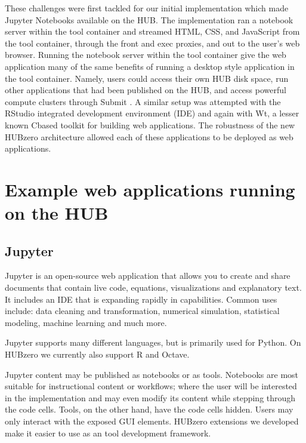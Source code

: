 \documentclass[conference]{../sty/IEEEtran}
\newcommand\CC{C\nolinebreak[4]\hspace{-.05em}\raisebox{.4ex}{\relsize{-3}{\textbf{++}}}\hspace{.25em}}
\begin{document}
These challenges were first tackled for our initial implementation which made
Jupyter Notebooks available on the HUB. The implementation ran a notebook
server within the tool container and streamed HTML, CSS, and JavaScript from
the tool container, through the front and exec proxies, and out to the user's
web browser. Running the notebook server within the tool container give the web
application many of the same benefits of running a desktop style application in
the tool container. Namely, users could access their own HUB disk space, run
other applications that had been published on the HUB, and access powerful
compute clusters through Submit \cite{submit}. A similar setup was attempted
with the RStudio integrated development environment (IDE) and again with Wt, a
lesser known \CC based toolkit for building web applications. The robustness of
the new HUBzero architecture allowed each of these applications to be deployed
as web applications.

\section {Example web applications running on the HUB}

\subsection {Jupyter}
Jupyter is an open-source web application that allows you to create and share documents that contain live code, equations, visualizations and explanatory text. It includes an IDE that is expanding rapidly in capabilities. Common uses include: data cleaning and transformation, numerical simulation, statistical modeling, machine learning and much more. 

Jupyter supports many different languages, but is primarily used for Python.  On HUBzero we currently also support R and Octave.  

Jupyter content may be published as notebooks or as tools.  Notebooks are most suitable for instructional content or workflows; where the user will be interested in the implementation and may even modify its content while stepping through the code cells.  Tools, on the other hand, have the code cells hidden.  Users may only interact with the exposed GUI elements. HUBzero extensions we developed make it easier to use as an tool development framework.
\end{document}

